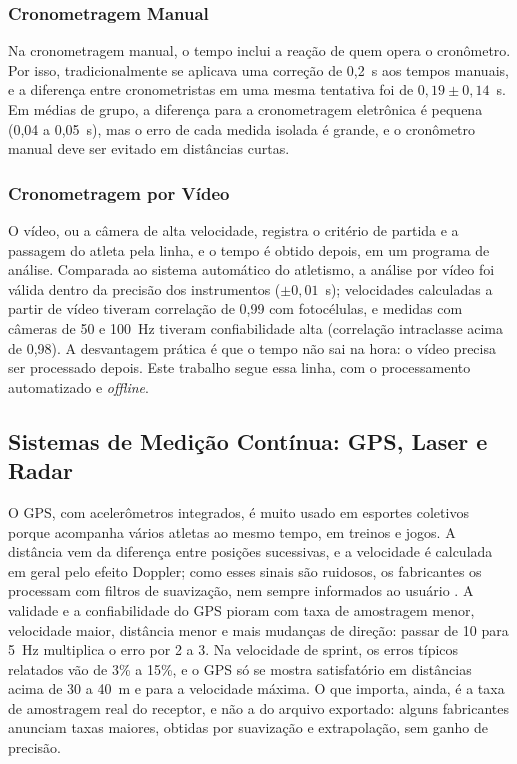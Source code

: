 \documentclass[
    12pt,               %
    openright,          %
    twoside,            %
    a4paper,            %
    chapter=TITLE,      %
    english,            %
    brazil              %
    ]{abntex2}
\begin{document}
\subsubsection{Cronometragem Manual}
Na cronometragem manual, o tempo inclui a reação de quem opera o cronômetro. Por isso, tradicionalmente se aplicava uma correção de 0,2~s aos tempos manuais, e a diferença entre cronometristas em uma mesma tentativa foi de $0{,}19 \pm 0{,}14$~s. Em médias de grupo, a diferença para a cronometragem eletrônica é pequena (0,04 a 0,05~s), mas o erro de cada medida isolada é grande, e o cronômetro manual deve ser evitado em distâncias curtas.

\subsubsection{Cronometragem por Vídeo}
O vídeo, ou a câmera de alta velocidade, registra o critério de partida e a passagem do atleta pela linha, e o tempo é obtido depois, em um programa de análise. Comparada ao sistema automático do atletismo, a análise por vídeo foi válida dentro da precisão dos instrumentos ($\pm 0{,}01$~s); velocidades calculadas a partir de vídeo tiveram correlação de 0,99 com fotocélulas, e medidas com câmeras de 50 e 100~Hz tiveram confiabilidade alta (correlação intraclasse acima de 0,98). A desvantagem prática é que o tempo não sai na hora: o vídeo precisa ser processado depois. Este trabalho segue essa linha, com o processamento automatizado e \textit{offline}.

\subsection{Sistemas de Medição Contínua: GPS, Laser e Radar}
\label{sec:continuos}

O GPS, com acelerômetros integrados, é muito usado em esportes coletivos porque acompanha vários atletas ao mesmo tempo, em treinos e jogos. A distância vem da diferença entre posições sucessivas, e a velocidade é calculada em geral pelo efeito Doppler; como esses sinais são ruidosos, os fabricantes os processam com filtros de suavização, nem sempre informados ao usuário \cite{bourdon2017monitoring}. A validade e a confiabilidade do GPS pioram com taxa de amostragem menor, velocidade maior, distância menor e mais mudanças de direção: passar de 10 para 5~Hz multiplica o erro por 2 a 3. Na velocidade de sprint, os erros típicos relatados vão de 3\% a 15\%, e o GPS só se mostra satisfatório em distâncias acima de 30 a 40~m e para a velocidade máxima. O que importa, ainda, é a taxa de amostragem real do receptor, e não a do arquivo exportado: alguns fabricantes anunciam taxas maiores, obtidas por suavização e extrapolação, sem ganho de precisão.
\end{document}
